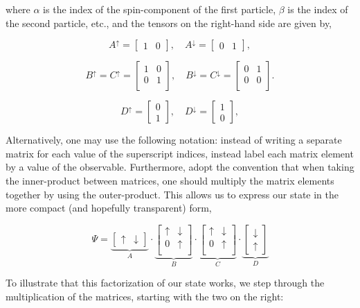 \documentclass{amsbook}
\theoremstyle{plain}
\theoremstyle{definition}
\theoremstyle{remark}
\newcommand{\bmat}[4]{
\begin{bmatrix}
#1 & #2\\
#3 & #4\\
\end{bmatrix}
}
\newcommand{\eqn}[2][]{\begin{equation}\label{#1}#2\end{equation}}
\begin{document}
\noindent where $\alpha$ is the index of the spin-component of the first particle, $\beta$ is the index of the second particle, etc., and the tensors on the right-hand side are given by,

$$A^\uparrow = \begin{bmatrix} 1 & 0 \end{bmatrix}, \quad A^\downarrow = \begin{bmatrix} 0 & 1 \end{bmatrix},$$

$$B^\uparrow=C^\uparrow = \bmat{1}{0}{0}{1}, \quad B^\downarrow=C^\downarrow = \bmat{0}{1}{0}{0}.$$

$$D^\uparrow = \begin{bmatrix} 0 \\ 1 \end{bmatrix}, \quad D^\downarrow = \begin{bmatrix} 1 \\ 0 \end{bmatrix},$$

Alternatively, one may use the following notation:  instead of writing a separate matrix for each value of the superscript indices, instead label each matrix element by a value of the observable.  Furthermore, adopt the convention that when taking the inner-product between matrices, one should multiply the matrix elements together by using the outer-product.  This allows us to express our state in the more compact (and hopefully transparent) form,

\eqn[W-matrix-factorization]{\Psi = \underbrace{\begin{bmatrix}\uparrow & \downarrow \end{bmatrix}}_{A}\cdot
         \underbrace{\bmat{\uparrow}{\downarrow}{0}{\uparrow}}_{B}\cdot
         \underbrace{\bmat{\uparrow}{\downarrow}{0}{\uparrow}}_{C}\cdot
         \underbrace{\begin{bmatrix}\downarrow \\ \uparrow \end{bmatrix}}_{D}}

To illustrate that this factorization of our state works, we step through the multiplication of the matrices, starting with the two on the right:
\end{document}
